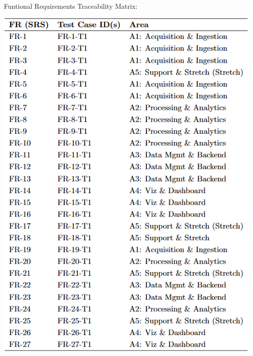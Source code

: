 \documentclass[12pt, titlepage]{article}
\begin{document}
  Funtional Requirements Traceability Matrix:
\begin{center}
  \includegraphics[width=\textwidth]{Images/FR-Tests-Traceability-Matrix.png}
\end{center}
\end{document}
